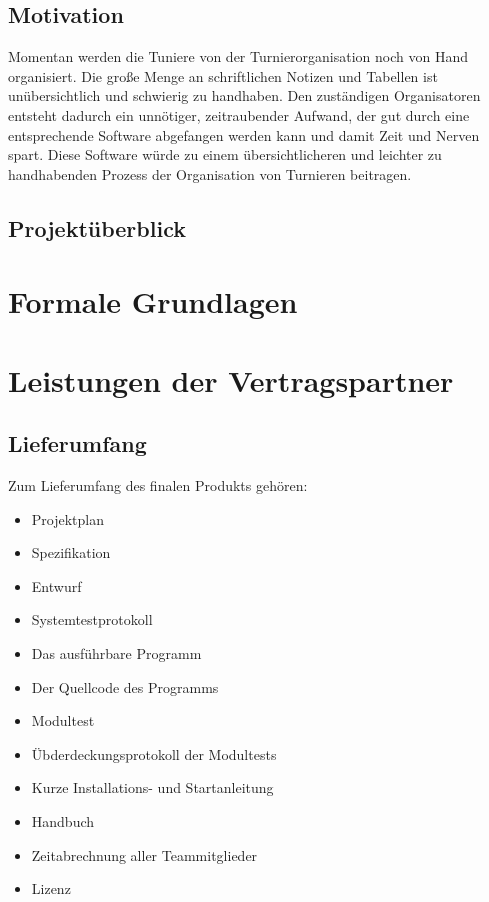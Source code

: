 \documentclass[11pt]{article}
\begin{document}
\subsection{Motivation}

Momentan werden die Tuniere von der Turnierorganisation noch von Hand organisiert. Die große Menge an schriftlichen Notizen und Tabellen ist unübersichtlich und schwierig zu handhaben. Den zuständigen Organisatoren entsteht dadurch ein unnötiger, zeitraubender Aufwand, der gut durch eine entsprechende Software abgefangen werden kann und damit Zeit und Nerven spart. Diese Software würde zu einem übersichtlicheren und leichter zu handhabenden Prozess der Organisation von Turnieren beitragen.

\subsection{Projektüberblick}

\section{Formale Grundlagen}

\section{Leistungen der Vertragspartner}

\subsection{Lieferumfang}

Zum Lieferumfang des finalen Produkts gehören:

\begin{itemize}
	\item Projektplan
	\item Spezifikation
	\item Entwurf
	\item Systemtestprotokoll
	\item Das ausführbare Programm
	\item Der Quellcode des Programms
	\item Modultest
	\item Übderdeckungsprotokoll der Modultests
	\item Kurze Installations- und Startanleitung
	\item Handbuch
	\item Zeitabrechnung aller Teammitglieder
	\item Lizenz
\end{itemize}
\end{document}
